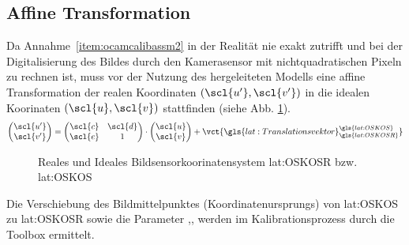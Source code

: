 \subsection{Affine Transformation}
Da Annahme~\ref{item:ocamcalibassm2} in der Realität nie exakt zutrifft und bei der Digitalisierung des Bildes durch den Kamerasensor mit nichtquadratischen Pixeln zu rechnen ist, muss vor der Nutzung des hergeleiteten Modells eine affine Transformation der realen Koordinaten \((\scl{u'}, \scl{v'})\) in die idealen Koorinaten \((\scl{u}, \scl{v})\) stattfinden (siehe Abb. \ref{fig:kameramodell:affin}).
\begin{equation}
\begin{pmatrix}
\scl{u'} \\ \scl{v'}
\end{pmatrix}
=
\begin{pmatrix}
\scl{c} & \scl{d} \\
\scl{e} & 1 
\end{pmatrix}
\cdot
\begin{pmatrix}
\scl{u} \\ \scl{v}
\end{pmatrix}
+
\vct{\gls{lat:Translationsvektor}^{\gls{lat:OSKOS}}_{\gls{lat:OSKOSR}}}
\end{equation}
\begin{figure}[htbp]
\centering
{}
\qquad
{}
\caption{Reales und Ideales Bildsensorkoorinatensystem \gls{lat:OSKOSR} bzw. \gls{lat:OSKOS}}
\label{fig:kameramodell:affin}
\end{figure}
 Die Verschiebung des Bildmittelpunktes (Koordinatenursprungs) von \gls{lat:OSKOS} zu \gls{lat:OSKOSR}  sowie die Parameter ,, werden im Kalibrationsprozess durch die Toolbox ermittelt.


